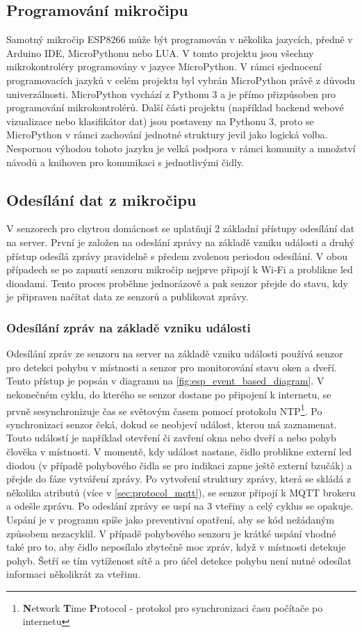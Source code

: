 \subsection*{Programování mikročipu} \label{subsec:microchip_programming}
Samotný mikročip ESP8266 může být programován v několika jazycích, předně v Arduino IDE, MicroPythonu nebo LUA. V tomto projektu jsou všechny mikrokontroléry programovány v jazyce MicroPython. V rámci sjednocení programovacích jazyků v celém projektu byl vybrán MicroPython právě z důvodu univerzálnosti. MicroPython vychází z Pythonu 3 a je přímo přizpůsoben pro programování mikrokontrolérů. Další části projektu (například backend webové vizualizace nebo klasifikátor dat) jsou postaveny na Pythonu 3, proto se MicroPython v rámci zachování jednotné struktury jevil jako logická volba. Nespornou výhodou tohoto jazyku je velká podpora v rámci komunity a množství návodů a knihoven pro komunikaci s jednotlivými čidly. 

\subsection*{Odesílání dat z mikročipu}
V senzorech pro chytrou domácnost se uplatňují 2 základní přístupy odesílání dat na server. První je založen na odeslání zprávy na základě vzniku události a druhý přístup odesílá zprávy pravidelně s předem zvolenou periodou odesílání. V obou případech se po zapnutí senzoru mikročip nejprve připojí k Wi-Fi a problikne led dioadami. Tento proces proběhne jednorázově a pak senzor přejde do stavu, kdy je připraven načítat data ze senzorů a publikovat zprávy.

\subsubsection*{Odesílání zpráv na základě vzniku události} \label{subsec:event_based_msg}
Odesílání zpráv ze senzoru na server na základě vzniku události používá senzor pro detekci pohybu v místnosti a senzor pro monitorování stavu oken a dveří. Tento přístup je popsán v diagramu na \cref{fig:esp_event_based_diagram}. V nekonečném cyklu, do kterého se senzor dostane po připojení k internetu, se prvně sesynchronizuje čas se světovým časem pomocí protokolu NTP\footnote{\textbf{N}etwork \textbf{T}ime \textbf{P}rotocol - protokol pro synchronizaci času počítače po internetu}. Po synchronizaci senzor čeká, dokud se neobjeví událost, kterou má zaznamenat. Touto událostí je například otevření či zavření okna nebo dveří a nebo pohyb člověka v místnosti. V momentě, kdy událost nastane, čidlo problikne externí led diodou (v případě pohybového čidla se pro indikaci zapne ještě externí bzučák) a přejde do fáze vytváření zprávy. Po vytvoření struktury zprávy, která se skládá z několika atributů (více v \cref{sec:protocol_mqtt}), se senzor připojí k MQTT brokeru a odešle zprávu. Po odeslání zprávy se uspí na 3 vteřiny a celý cyklus se opakuje. Uspání je v programu spíše jako preventivní opatření, aby se kód nežádaným způsobem nezacyklil. V případě pohybového senzoru je krátké uspání vhodné také pro to, aby čidlo neposílalo zbytečně moc zpráv, když v místnosti detekuje pohyb. Šetří se tím vytíženost sítě a pro účel detekce pohybu není nutné odesílat informaci několikrát za vteřinu.

